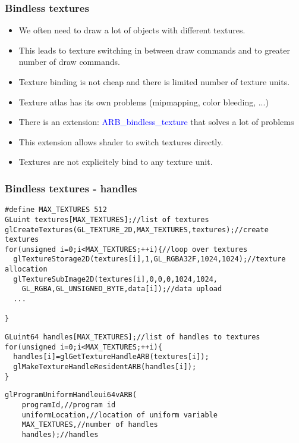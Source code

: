 \begin{frame}[fragile]
\frametitle{Bindless textures}
  \begin{itemize}
    \item We often need to draw a lot of objects with different textures.
    \item This leads to texture switching in between draw commands and to greater number of draw commands.
    \item Texture binding is not cheap and there is limited number of texture units.
    \item Texture atlas has its own problems (mipmapping, color bleeding, ...)
    \item There is an extension: \textcolor{blue}{ARB\_bindless\_texture} that solves a lot of problems
    \item This extension allows shader to switch textures directly.
    \item Textures are not explicitely bind to any texture unit.
  \end{itemize}
\end{frame}

\begin{frame}[fragile]
\frametitle{Bindless textures - handles}
{\scriptsize
\begin{verbatim}
#define MAX_TEXTURES 512
GLuint textures[MAX_TEXTURES];//list of textures
glCreateTextures(GL_TEXTURE_2D,MAX_TEXTURES,textures);//create textures
for(unsigned i=0;i<MAX_TEXTURES;++i){//loop over textures
  glTextureStorage2D(textures[i],1,GL_RGBA32F,1024,1024);//texture allocation
  glTextureSubImage2D(textures[i],0,0,0,1024,1024,
    GL_RGBA,GL_UNSIGNED_BYTE,data[i]);//data upload
  ...
  
}
\end{verbatim}
}
{\scriptsize
\begin{verbatim}
GLuint64 handles[MAX_TEXTURES];//list of handles to textures
for(unsigned i=0;i<MAX_TEXTURES;++i){
  handles[i]=glGetTextureHandleARB(textures[i]);
  glMakeTextureHandleResidentARB(handles[i]);
}
\end{verbatim}
}
{\scriptsize
\begin{verbatim}
glProgramUniformHandleui64vARB(
    programId,//program id
    uniformLocation,//location of uniform variable
    MAX_TEXTURES,//number of handles
    handles);//handles
\end{verbatim}
}
\end{frame}

